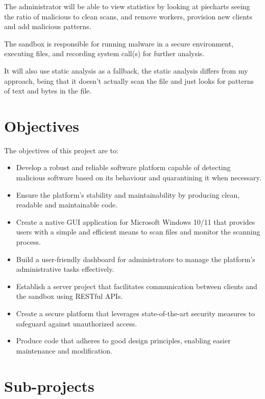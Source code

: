 The administrator will be able to view statistics by looking at piecharts
seeing the ratio of malicious to clean scans,
and remove workers, provision new clients and add malicious patterns.

The sandbox is responsible for running malware in a secure environment,
executing files, and recording system call(s) for further analysis.

It will also use static analysis as a fallback,
the static analysis differs from my approach, being that it doesn't actually scan the file
and just looks for patterns of text and bytes in the file.


\section{Objectives}
The objectives of this project are to:
\begin{itemize}
\item Develop a robust and reliable software platform capable of detecting
      malicious software based on its behaviour and quarantining it when necessary.
\item Ensure the platform's stability and maintainability by producing clean,
      readable and maintainable code.
\item Create a native GUI application for Microsoft Windows 10/11
      that provides users with a simple and efficient means to
      scan files and monitor the scanning process.
\item Build a user-friendly dashboard for administrators to manage
      the platform's administrative tasks effectively.
\item Establish a server project that facilitates communication between
      clients and the sandbox using RESTful APIs.
\item Create a secure platform that leverages state-of-the-art security
      measures to safeguard against unauthorized access.
\item Produce code that adheres to good design principles,
      enabling easier maintenance and modification.
\end{itemize}

\section{Sub-projects}
